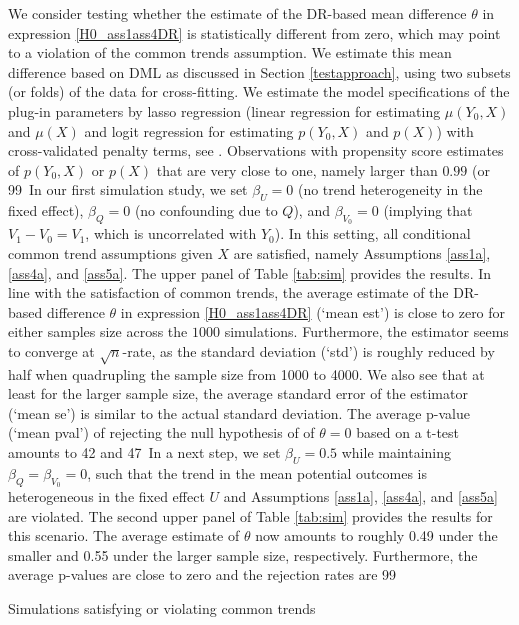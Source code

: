 {	We consider testing whether the estimate of the DR-based mean difference $\theta$ in expression \eqref{H0_ass1ass4DR} is statistically different from zero, which may point to a violation of the common trends assumption. We estimate this mean difference based on DML as discussed in Section \ref{testapproach}, using two subsets (or folds) of the data for cross-fitting. We estimate the model specifications of the plug-in parameters by lasso regression (linear regression for estimating $\mu(Y_0,X)$ and $\mu(X)$ and logit regression for estimating $p(Y_0,X)$ and $p(X)$) with cross-validated penalty terms, see \citet{Tibshirani96}. Observations with propensity score estimates of $p(Y_0,X)$ or $p(X)$ that are very close to one, namely larger than $0.99$ (or 99\	
	In our first simulation study, we set $\beta_U=0$ (no trend heterogeneity in the fixed effect), $\beta_Q=0$ (no confounding due to $Q$), and $\beta_{V_0}=0$ (implying that $V_1-V_0=V_1$, which is uncorrelated with $Y_0$). In this setting, all conditional common trend assumptions given $X$ are satisfied, namely Assumptions \ref{ass1a}, \ref{ass4a}, and \ref{ass5a}. The upper panel of Table \ref{tab:sim} provides the results. In line with the satisfaction of common trends, the average estimate of the DR-based difference $\theta$ in expression \eqref{H0_ass1ass4DR} (`mean est') is close to zero for either samples size across the $1000$ simulations. Furthermore, the estimator seems to converge at $\sqrt{n}$-rate, as the standard deviation (`std') is roughly reduced by half when quadrupling the sample size from 1000 to 4000. We also see that at least for the larger sample size, the average standard error of the estimator (`mean se') is similar to the actual standard deviation. The average p-value (`mean pval') of rejecting the null hypothesis of of $\theta=0$ based on a t-test amounts to 42 and 47\	
	In a next step, we set $\beta_U=0.5$ while maintaining $\beta_Q=\beta_{V_0}=0$, such that the trend in the mean potential outcomes is heterogeneous in the fixed effect $U$ and Assumptions \ref{ass1a}, \ref{ass4a}, and \ref{ass5a} are violated. The second upper panel of Table \ref{tab:sim} provides the results for this scenario. The average estimate of $\theta$ now amounts to roughly 0.49 under the smaller and 0.55 under the larger sample size, respectively. Furthermore, the average p-values are close to zero and the rejection rates are 99\	
	\begin{table}[htbp]
		\begin{center}
			\caption{Simulations satisfying or violating common trends}

\end{center}
\end{table}}
